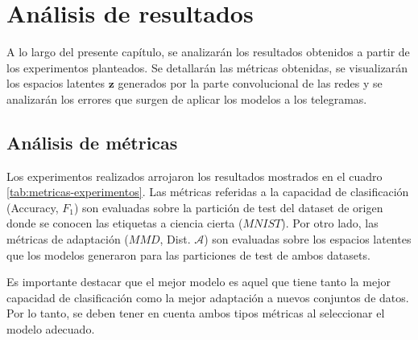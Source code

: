 \chapter{Análisis de resultados}

\label{Chapter4}

A lo largo del presente capítulo, se analizarán los resultados obtenidos a partir de los experimentos planteados. Se
detallarán las métricas obtenidas, se visualizarán los espacios latentes $\mathbf{z}$ generados por la parte
convolucional de las redes y se analizarán los errores que surgen de aplicar los modelos a los telegramas.

\section{Análisis de métricas}

Los experimentos realizados arrojaron los resultados mostrados en el cuadro \ref{tab:metricas-experimentos}. Las
métricas referidas a la capacidad de clasificación (Accuracy, $F_1$) son evaluadas sobre la partición de test del
dataset de origen donde se conocen las etiquetas a ciencia cierta ($MNIST$). Por otro lado, las métricas de adaptación
($MMD$, Dist. $\mathcal{A}$) son evaluadas sobre los espacios latentes que los modelos generaron para las particiones
de test de ambos datasets.

Es importante destacar que el mejor modelo es aquel que tiene tanto la mejor capacidad de clasificación como la mejor
adaptación a nuevos conjuntos de datos. Por lo tanto, se deben tener en cuenta ambos tipos métricas al seleccionar el
modelo adecuado.

